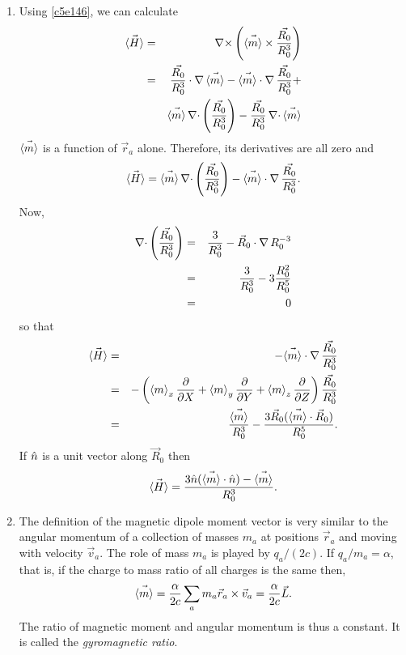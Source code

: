 \begin{enumerate}
\item Using \eqref{c5e146}, we can calculate
\begin{eqnarray*}
\vec{\left\langle{H}\right\rangle} &=& \operatorname{\nabla\times}\left(\vec{\left\langle{m}\right\rangle} \times \frac{\vec{R_0}}{R_0^3}\right) \\
 &=& \frac{\vec{R_0}}{R_0^3}\cdot\operatorname{\nabla}\vec{\left\langle{m}\right\rangle} - 
  \vec{\left\langle{m}\right\rangle}\cdot\operatorname{\nabla}\frac{\vec{R_0}}{R_0^3} + \\
 & & \vec{\left\langle{m}\right\rangle}\operatorname{\nabla\cdot}\left(\frac{\vec{R_0}}{R_0^3}\right) - 
  \frac{\vec{R_0}}{R_0^3}\operatorname{\nabla\cdot}\vec{\left\langle{m}\right\rangle}
\end{eqnarray*}
$\vec{\left\langle{m}\right\rangle}$ is a function of $\vec{r}_a$ alone. Therefore, its derivatives are all
zero and
\begin{equation}\label{c5e147}
\vec{\left\langle{H}\right\rangle} = \vec{\left\langle{m}\right\rangle}\operatorname{\nabla\cdot}\left(\frac{\vec{R_0}}{R_0^3}\right) -
\vec{\left\langle{m}\right\rangle}\cdot\operatorname{\nabla}\frac{\vec{R_0}}{R_0^3}.
\end{equation}
Now,
\begin{eqnarray*}
\operatorname{\nabla\cdot}\left(\frac{\vec{R_0}}{R_0^3}\right) &=& 
\frac{3}{R_0^3} - \vec{R}_0\cdot\operatorname{\nabla} R_0^{-3} \\
 &=& \frac{3}{R_0^3} - 3\frac{R_0^2}{R_0^5} \\
 &=& 0
\end{eqnarray*}
so that
\begin{eqnarray*}
\vec{\left\langle{H}\right\rangle} &=& -\vec{\left\langle{m}\right\rangle}\cdot\operatorname{\nabla}\frac{\vec{R_0}}{R_0^3} \\
 &=& -\left(\left\langle{m}\right\rangle_x\frac{\partial}{\partial X} + 
  \left\langle{m}\right\rangle_y\frac{\partial}{\partial Y} + 
  \left\langle{m}\right\rangle_z\frac{\partial}{\partial Z}\right)\frac{\vec{R_0}}{R_0^3} \\
 &=& \frac{\vec{\left\langle{m}\right\rangle}}{R_0^3} - \frac{3\vec{R}_0(\vec{\left\langle{m}\right\rangle}\cdot\vec{R}_0)}{R_0^5}.
\end{eqnarray*}
If $\hat{n}$ is a unit vector along $\vec{R}_0$ then
\begin{equation}\label{c5e148}
\vec{\left\langle{H}\right\rangle} = \frac{3\hat{n}(\vec{\left\langle{m}\right\rangle}\cdot\hat{n}) - \vec{\left\langle{m}\right\rangle}}{R_0^3}.
\end{equation}

\item The definition of the magnetic dipole moment vector is very similar to the
angular momentum of a collection of masses $m_a$ at positions $\vec{r}_a$ and 
moving with velocity $\vec{v}_a$. The role of mass $m_a$ is played by 
$q_a/(2c)$.  If $q_a/m_a = \alpha$, that is, if the charge to mass ratio of all 
charges is the same then,
\begin{equation}\label{c5e149}
\vec{\left\langle{m}\right\rangle} = \frac{\alpha}{2c}\sum_a m_a\vec{r}_a \times \vec{v}_a = 
\frac{\alpha}{2c}\vec{L}.
\end{equation}
The ratio of magnetic moment and angular momentum is thus a constant. It is 
called the \emph{gyromagnetic ratio}.


\end{enumerate}
